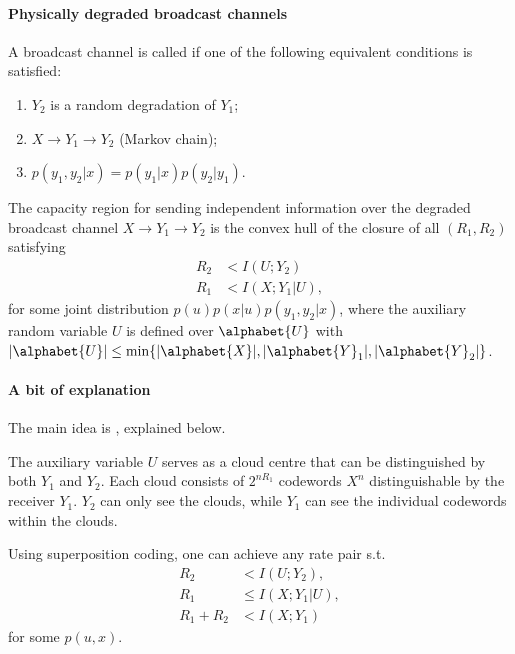 \documentclass[a4paper, 11pt, openany]{book}
\begin{document}
\paragraph{Physically degraded broadcast channels}
A broadcast channel is called  if one of the following equivalent conditions is satisfied:
\begin{enumerate}
	\item $Y_2$ is a random degradation of $Y_1$;

	\item $X \to Y_1 \to Y_2$ (Markov chain);

	\item $p(y_1, y_2 | x) = p(y_1 | x) p(y_2 | y_1)$.
\end{enumerate}

\begin{theorem}
The capacity region for sending independent information over the degraded broadcast channel $X \to Y_1 \to Y_2$ is the convex hull of the closure of all $(R_1, R_2)$ satisfying
\begin{align*}
	R_2 &< I(U; Y_2)\\
	R_1 &< I(X; Y_1 | U),
\end{align*}
for some joint distribution $p(u) p(x | u) p(y_1, y_2 | x)$, where the auxiliary random variable $U$ is defined over $\alphabet{U}$ with $|\alphabet{U}| \le \min \{ |\alphabet{X}|, |\alphabet{Y}_1|, |\alphabet{Y}_2| \}$.
\end{theorem}



\paragraph{A bit of explanation}
The main idea is , explained below.

The auxiliary variable $U$ serves as a cloud centre that can be distinguished by both $Y_1$ and $Y_2$. Each cloud consists of $2^{nR_1}$ codewords $X^n$ distinguishable by the receiver $Y_1$. $Y_2$ can only see the clouds, while $Y_1$ can see the individual codewords within the clouds.

Using superposition coding, one can achieve any rate pair s.t.
\begin{align*}
	R_2 &< I(U; Y_2),\\
	R_1 &\le I(X; Y_1 | U),\\
	R_1 + R_2 &< I(X; Y_1)
\end{align*}
for some $p(u,x)$.
\end{document}

